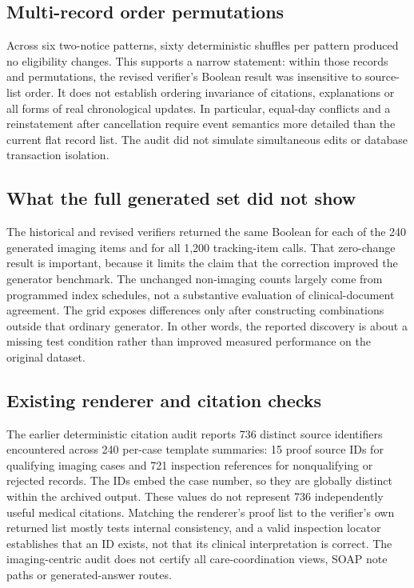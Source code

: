 \documentclass[11pt,twocolumn]{article}
\begin{document}
\subsection{Multi-record order permutations}
Across six two-notice patterns, sixty deterministic shuffles per pattern produced no eligibility changes. This supports a narrow statement: within those records and permutations, the revised verifier's Boolean result was insensitive to source-list order. It does not establish ordering invariance of citations, explanations or all forms of real chronological updates. In particular, equal-day conflicts and a reinstatement after cancellation require event semantics more detailed than the current flat record list. The audit did not simulate simultaneous edits or database transaction isolation.

\subsection{What the full generated set did not show}
The historical and revised verifiers returned the same Boolean for each of the 240 generated imaging items and for all 1,200 tracking-item calls. That zero-change result is important, because it limits the claim that the correction improved the generator benchmark. The unchanged non-imaging counts largely come from programmed index schedules, not a substantive evaluation of clinical-document agreement. The grid exposes differences only after constructing combinations outside that ordinary generator. In other words, the reported discovery is about a missing test condition rather than improved measured performance on the original dataset.

\subsection{Existing renderer and citation checks}
The earlier deterministic citation audit reports 736 distinct source identifiers encountered across 240 per-case template summaries: 15 proof source IDs for qualifying imaging cases and 721 inspection references for nonqualifying or rejected records. The IDs embed the case number, so they are globally distinct within the archived output. These values do not represent 736 independently useful medical citations. Matching the renderer's proof list to the verifier's own returned list mostly tests internal consistency, and a valid inspection locator establishes that an ID exists, not that its clinical interpretation is correct. The imaging-centric audit does not certify all care-coordination views, SOAP note paths or generated-answer routes.
\end{document}
